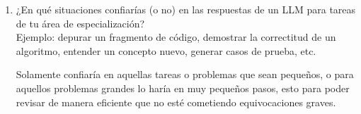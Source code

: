 \documentclass[a4paper, 11pt]{article}
\newcommand{\Pspace}{0.5cm}
\newcommand{\Aspace}{0.2cm}
\begin{document}
\begin{enumerate}
            \vspace{\Aspace} \par
            d) ¿Es claro?
            \\ { \color{azul} }

            \vspace{\Aspace} \par
            e) ¿Podría mejorarse en algún sentido?
            \\ { \color{azul} }

            \vspace{\Aspace} \par
            f) ¿Qué papel juegas tú como futuro egresado de ciencias de la computación en esta nueva realidad?
            \\ { \color{azul} }



        \vspace{\Pspace}
        \item ¿En qué situaciones confiarías (o no) en las respuestas de un LLM para tareas de tu área de especialización? \\
        Ejemplo: depurar un fragmento de código, demostrar la correctitud de un algoritmo, entender un concepto nuevo, generar casos de prueba, etc. \par
            \vspace{\Aspace} \par
            { \color{azul} Solamente confiaría en aquellas tareas o problemas que sean pequeños, o para aquellos problemas grandes lo haría en muy pequeños pasos, esto para poder revisar de manera eficiente que no esté cometiendo equivocaciones graves. }
    \end{enumerate}



\end{document}
